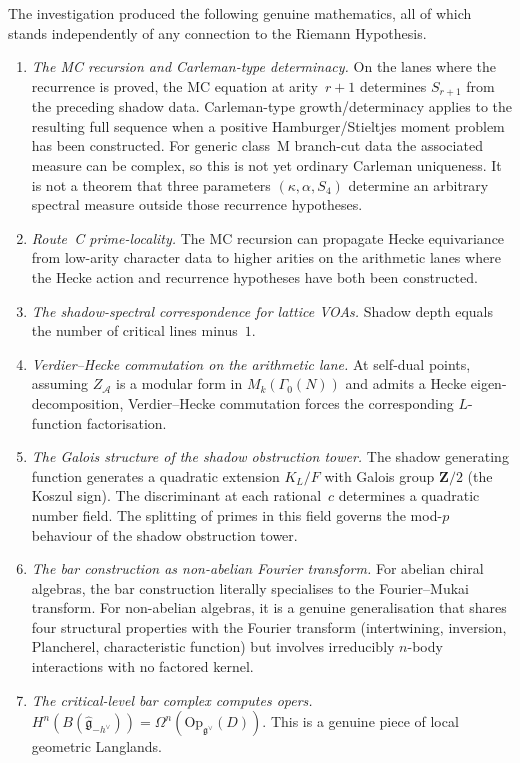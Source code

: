 \documentclass[11pt]{article}
\newcommand{\cA}{\mathcal{A}}
\begin{document}
The investigation produced the following genuine mathematics,
all of which stands independently of any connection to the
Riemann Hypothesis.

\begin{enumerate}
\item \emph{The MC recursion and Carleman-type determinacy.}
On the lanes where the recurrence is proved, the MC equation at
arity~$r+1$ determines $S_{r+1}$ from the preceding shadow data.
Carleman-type growth/determinacy applies to the resulting full
sequence when a positive Hamburger/Stieltjes moment problem has been
constructed.  For generic class~M branch-cut data the associated
measure can be complex, so this is not yet ordinary Carleman
uniqueness.  It is not a theorem that three parameters
$(\kappa,\alpha,S_4)$ determine an arbitrary spectral measure
outside those recurrence hypotheses.

\item \emph{Route~C prime-locality.}  The MC recursion can
propagate Hecke equivariance from low-arity character data to
higher arities on the arithmetic lanes where the Hecke action and
recurrence hypotheses have both been constructed.

\item \emph{The shadow-spectral correspondence for lattice
VOAs.}  Shadow depth equals the number of critical lines
minus~$1$.

\item \emph{Verdier--Hecke commutation on the arithmetic lane.}
At self-dual points, assuming $Z_\cA$ is a modular form in
$M_k(\Gamma_0(N))$ and admits a Hecke eigen-decomposition,
Verdier--Hecke commutation forces the corresponding
$L$-function factorisation.

\item \emph{The Galois structure of the shadow obstruction tower.}
The shadow generating function generates a quadratic extension
$K_L/F$ with Galois group $\mathbf{Z}/2$ (the Koszul sign).
The discriminant at each rational~$c$ determines a quadratic
number field.  The splitting of primes in this field governs
the mod-$p$ behaviour of the shadow obstruction tower.

\item \emph{The bar construction as non-abelian Fourier
transform.}  For abelian chiral algebras, the bar construction
literally specialises to the Fourier--Mukai transform.
For non-abelian algebras, it is a genuine generalisation that
shares four structural properties with the Fourier transform
(intertwining, inversion, Plancherel, characteristic function)
but involves irreducibly $n$-body interactions with no factored
kernel.

\item \emph{The critical-level bar complex computes opers.}
$H^n(B(\hat{\mathfrak{g}}_{-h^\vee}))
= \Omega^n(\mathrm{Op}_{\mathfrak{g}^\vee}(D))$.
This is a genuine piece of local geometric Langlands.
\end{enumerate}
\end{document}
